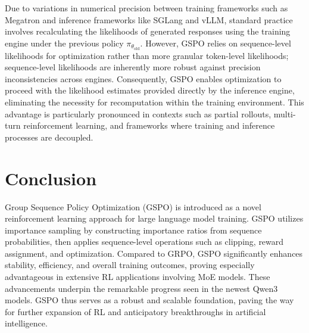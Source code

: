 Due to variations in numerical precision between training frameworks such as Megatron and inference frameworks like SGLang and vLLM, standard practice involves recalculating the likelihoods of generated responses using the training engine under the previous policy $\pi_{\theta_\text{old}}$. However, GSPO relies on sequence-level likelihoods for optimization rather than more granular token-level likelihoods; sequence-level likelihoods are inherently more robust against precision inconsistencies across engines. Consequently, GSPO enables optimization to proceed with the likelihood estimates provided directly by the inference engine, eliminating the necessity for recomputation within the training environment. This advantage is particularly pronounced in contexts such as partial rollouts, multi-turn reinforcement learning, and frameworks where training and inference processes are decoupled.

\section{Conclusion}

Group Sequence Policy Optimization (GSPO) is introduced as a novel reinforcement learning approach for large language model training. GSPO utilizes importance sampling by constructing importance ratios from sequence probabilities, then applies sequence-level operations such as clipping, reward assignment, and optimization. Compared to GRPO, GSPO significantly enhances stability, efficiency, and overall training outcomes, proving especially advantageous in extensive RL applications involving MoE models. These advancements underpin the remarkable progress seen in the newest Qwen3 models. GSPO thus serves as a robust and scalable foundation, paving the way for further expansion of RL and anticipatory breakthroughs in artificial intelligence.

